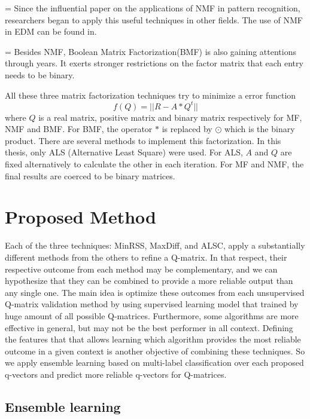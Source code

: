 \documentclass[12pt]{article}
\begin{document}
\parskip = \baselineskip
Since the influential paper on the applications of NMF in pattern  recognition\cite{lee1999learning}, researchers began to apply this useful techniques in other fields. The use of NMF in EDM can be found in\cite{desmarais2012mapping}.

\parskip = \baselineskip
Besides NMF, Boolean Matrix Factorization(BMF) is also gaining attentions through years. It exerts stronger restrictions on the factor matrix that each entry needs to be binary.

All these three matrix factorization techniques try to minimize a error function
$$ f(Q)=||R-A*Q^t||$$
where $Q$ is a real matrix, positive matrix and binary matrix respectively for MF, NMF and BMF. For BMF, the operator $*$ is replaced by $\odot$ which is the binary product. There are several methods to implement this factorization. In this thesis, only ALS (Alternative Least Square) were used. For ALS, $A$ and $Q$ are fixed alternatively to calculate the other in each iteration. For MF and NMF, the final results are coerced to be binary matrices. 




\section{Proposed Method}

 Each of the three techniques: MinRSS, MaxDiff, and ALSC, apply a substantially different methods from the others to refine a Q-matrix. In that respect, their respective outcome from each method may be complementary, and we can hypothesize that they can be combined to provide a more reliable output than any single one. The main idea is optimize these outcomes from each unsupervised Q-matrix validation method by using supervised learning model that trained by huge amount of all possible Q-matrices. Furthermore, some algorithms are more effective in general, but may not be the best performer in all context.  Defining the features that that allows learning which algorithm provides the most reliable outcome in a given context is another objective of combining these techniques. So we apply ensemble learning based on multi-label classification over each proposed q-vectors and predict more reliable q-vectors for Q-matrices. 

\subsection{Ensemble learning}
\end{document}
